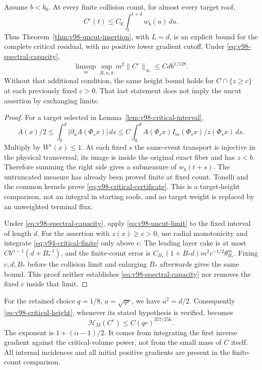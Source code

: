 \begin{theorem}
\label{thm:v98-critical-certificate}
Assume $b<b_0$. At every finite collision count, for almost every
target roof,
\begin{equation}\label{eq:v98-critical-certificate}
 C^\varepsilon(t)\le C_0\int_t^{t+d}w_b(u)\,du.
\end{equation}
Thus Theorem~\ref{thm:v98-uncut-insertion}, with $L=d$, is an
explicit bound for the complete critical residual, with no positive
lower gradient cutoff. Under \eqref{eq:v98-spectral-capacity},
\begin{equation}\label{eq:v98-critical-height}
 \limsup_m\sup_{R,n,k}m^2\|C^\varepsilon\|_\infty
                              \le C d b^{1/128}.
\end{equation}
Without that additional condition, the same height bound holds for
$C\cap\{z\ge c\}$ at each previously fixed $c>0$. That last
statement does not imply the uncut assertion by exchanging limits.
\end{theorem}
\begin{proof}
For a target selected in Lemma~\ref{lem:v98-critical-interval},
\[
 A(x)/2\le\int_0^d|\partial_uA(\Phi_sx)|\,ds
       \le C\int_0^d A(\Phi_sx)I_m(\Phi_sx)/z(\Phi_sx)\,ds.
\]
Multiply by $W^\varepsilon(x)\le1$. At each fixed $s$ the
same-event transport is injective in the physical transversal; its
image is inside the original exact fiber and has $z<b$. Therefore
summing the right side gives a submeasure of $w_b(t+s)$.
The untruncated measure has already been proved finite at fixed
count. Tonelli and the common kernels prove
\eqref{eq:v98-critical-certificate}. This is a target-height
comparison, not an integral in starting roofs, and no target weight
is replaced by an unweighted terminal flux.

Under \eqref{eq:v98-spectral-capacity}, apply
\eqref{eq:v98-uncut-limit} to the fixed interval of length $d$.
For the assertion with $z(x)\ge c>0$, use radial monotonicity and
integrate \eqref{eq:v94-critical-finite} only above $c$.
The leading layer cake is at most
$C b^{\alpha-1}(d+B_*^{-1})$, and the finite-count error is
$C_{B_*}(1+B_*d)m^2c^{-1/2}\theta_{B_*}^m$.
Fixing $c,d,B_*$ before the collision limit and enlarging $B_*$
afterwards gives the same bound. This proof neither establishes
\eqref{eq:v98-spectral-capacity} nor removes the fixed $c$ inside
that limit.
\end{proof}

For the retained choice $q=1/8$, $a=\sqrt{qr}$, we have $a^2=d/2$.
Consequently \eqref{eq:v98-critical-height}, whenever its stated
hypothesis is verified, becomes
\begin{equation}\label{eq:v98-critical-power}
             \mathcal H_M(C^\varepsilon)\le C(qr)^{257/256}.
\end{equation}
The exponent is $1+(\alpha-1)/2$. It comes from integrating the
first inverse gradient against the critical-volume power, not from
the small mass of $C$ itself. All internal incidences and all initial
positive gradients are present in the finite-count comparison.

